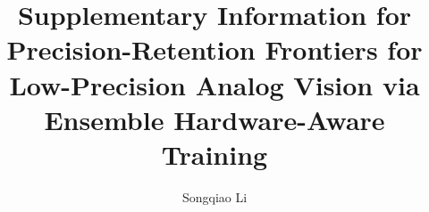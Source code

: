 \documentclass[11pt,a4paper]{article}
\title{Supplementary Information for\\
Precision-Retention Frontiers for Low-Precision Analog Vision via Ensemble Hardware-Aware Training}
\author{Songqiao Li}
\date{}
\begin{document}
\maketitle

\renewcommand{\thefigure}{S\arabic{figure}}
\renewcommand{\thetable}{S\arabic{table}}
\setcounter{figure}{0}
\setcounter{table}{0}





\end{document}
